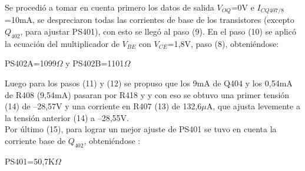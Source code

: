 \documentclass[12pt]{book}
\begin{document}
Se procedió a tomar en cuenta primero los datos de salida $V_{OQ}$=0V e $I_{CQ407/8}$=10mA, se despreciaron todas las corrientes de base de los transistores (excepto $Q_{402}$, para ajustar PS401), con esto se llegó al paso (9). En el paso (10) se aplicó la ecuación del multiplicador de $V_{BE}$  con $V_{CE}$=1,8V, paso (8), obteniéndose:\\
\begin{center}
PS402A=1099$\Omega$  y  PS402B=1101$\Omega$
\end{center}
Luego para los pasos (11) y (12) se propuso que los 9mA de Q404 y los 0,54mA de R408 (9,54mA) pasaran por R418 y y con eso se obtuvo una primer tensión (14) de –28,57V y una corriente en R407 (13) de 132,6$\mu$A, que ajusta levemente a la tensión anterior (14) a –28,55V.\\
Por último (15), para lograr un mejor ajuste de PS401 se tuvo en cuenta la corriente base de $Q_{402}$, obteniéndose :
\begin{center}
PS401=50,7K$\Omega$
\end{center}
\end{document}

